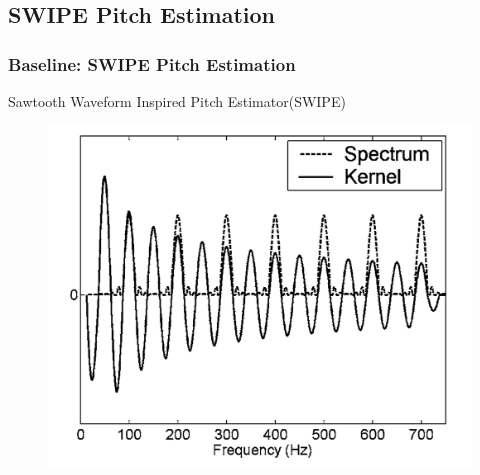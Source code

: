 \documentclass{beamer}
\begin{document}


\subsection{SWIPE Pitch Estimation}
\begin{frame}
\frametitle{Baseline: SWIPE Pitch Estimation}
Sawtooth Waveform Inspired Pitch Estimator(SWIPE)
\begin{figure}
\includegraphics[width=0.6\linewidth]{Image/SWIPE_kernel.png}
\end{figure}




\end{frame}
\end{document}
